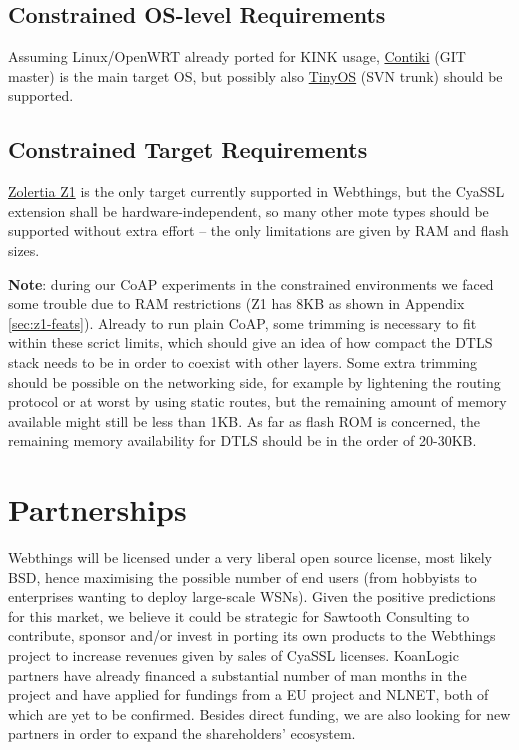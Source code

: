 \documentclass[10pt]{article}
\begin{document}
\subsection{Constrained OS-level Requirements}
Assuming Linux/OpenWRT already ported for KINK usage, \href{http://www.contiki-os.org}{Contiki} (GIT master) is the main target OS, but possibly also \href{http://www.tinyos.net}{TinyOS} (SVN trunk) should be supported.

\subsection{Constrained Target Requirements}
\href{http://www.zolertia.com/ti}{Zolertia Z1} is the only target currently supported in Webthings, but the CyaSSL extension shall be hardware-independent, so many other mote types should be supported without extra effort -- the only limitations are given by RAM and flash sizes.

\textbf{Note}: during our CoAP experiments in the constrained environments we faced some trouble due to RAM restrictions (Z1 has 8KB as shown in Appendix \ref{sec:z1-feats}). Already to run plain CoAP, some trimming is necessary to fit within these scrict limits, which should give an idea of how compact the DTLS stack needs to be in order to coexist with other layers. Some extra trimming should be possible on the networking side, for example by lightening the routing protocol or at worst by using static routes, but the remaining amount of memory available might still be less than 1KB. As far as flash ROM is concerned, the remaining memory availability for DTLS should be in the order of 20-30KB.

\section{Partnerships}
Webthings will be licensed under a very liberal open source license, most likely BSD, hence maximising the possible number of end users (from hobbyists to enterprises wanting to deploy large-scale WSNs). Given the positive predictions for this market, we believe it could be strategic for Sawtooth Consulting to contribute, sponsor and/or invest in porting its own products to the Webthings project to increase revenues given by sales of CyaSSL licenses. KoanLogic partners have already financed a substantial number of man months in the project and have applied for fundings from a EU project and NLNET, both of which are yet to be confirmed. Besides direct funding, we are also looking for new partners in order to expand the shareholders' ecosystem.
\end{document}

